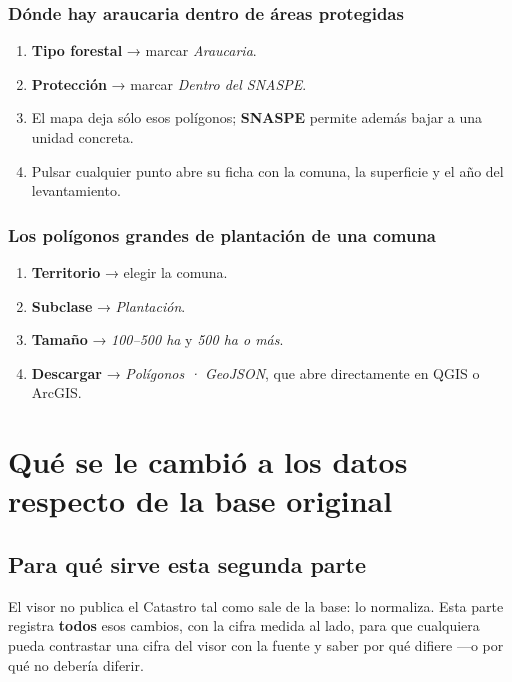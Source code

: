 \documentclass[11pt,a4paper]{report}
\newcommand{\campo}[1]{\textcolor{conaf}{\textbf{#1}}}
\begin{document}
\section{Dónde hay araucaria dentro de áreas protegidas}
\begin{enumerate}
  \item \campo{Tipo forestal} → marcar \emph{Araucaria}.
  \item \campo{Protección} → marcar \emph{Dentro del SNASPE}.
  \item El mapa deja sólo esos polígonos; \campo{SNASPE} permite además bajar a
        una unidad concreta.
  \item Pulsar cualquier punto abre su ficha con la comuna, la superficie y el
        año del levantamiento.
\end{enumerate}

\section{Los polígonos grandes de plantación de una comuna}
\begin{enumerate}
  \item \campo{Territorio} → elegir la comuna.
  \item \campo{Subclase} → \emph{Plantación}.
  \item \campo{Tamaño} → \emph{100--500 ha} y \emph{500 ha o más}.
  \item \campo{Descargar} → \emph{Polígonos · GeoJSON}, que abre directamente en
        QGIS o ArcGIS.
\end{enumerate}

\part{Qué se le cambió a los datos respecto de la base original}

\chapter{Para qué sirve esta segunda parte}

El visor no publica el Catastro tal como sale de la base: lo normaliza. Esta
parte registra \campo{todos} esos cambios, con la cifra medida al lado, para que
cualquiera pueda contrastar una cifra del visor con la fuente y saber por qué
difiere —o por qué no debería diferir.
\end{document}
